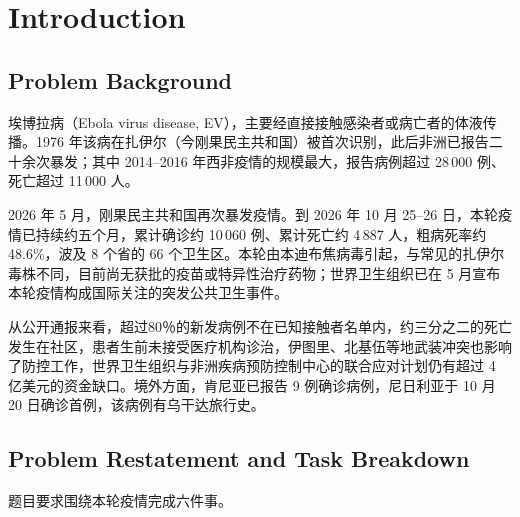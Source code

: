 \section{Introduction}
\label{sec:introduction}

\subsection{Problem Background}

埃博拉病（Ebola virus disease, EV），主要经直接接触感染者或病亡者的体液传播。1976 年该病在扎伊尔（今刚果民主共和国）被首次识别，此后非洲已报告二十余次暴发；其中 2014--2016 年西非疫情的规模最大，报告病例超过 28\,000 例、死亡超过 11\,000 人\cite{whofactsheet,reliefweb2016}。

2026 年 5 月，刚果民主共和国再次暴发疫情。到 2026 年 10 月 25--26 日，本轮疫情已持续约五个月，累计确诊约 10\,060 例、累计死亡约 4\,887 人，粗病死率约 48.6\%，波及 8 个省的 66 个卫生区\cite{whodon622,ebolatrader}。本轮由本迪布焦病毒引起，与常见的扎伊尔毒株不同，目前尚无获批的疫苗或特异性治疗药物；世界卫生组织已在 5 月宣布本轮疫情构成国际关注的突发公共卫生事件\cite{whosituation2026}。

从公开通报来看，超过{80％}的新发病例不在已知接触者名单内，约三分之二的死亡发生在社区，患者生前未接受医疗机构诊治，伊图里、北基伍等地武装冲突也影响了防控工作，世界卫生组织与非洲疾病预防控制中心的联合应对计划仍有超过 4 亿美元的资金缺口\cite{whodg2026}。境外方面，肯尼亚已报告 9 例确诊病例，尼日利亚于 10 月 20 日确诊首例，该病例有乌干达旅行史\cite{whodon622}。

\subsection{Problem Restatement and Task Breakdown}

题目要求围绕本轮疫情完成六件事。

